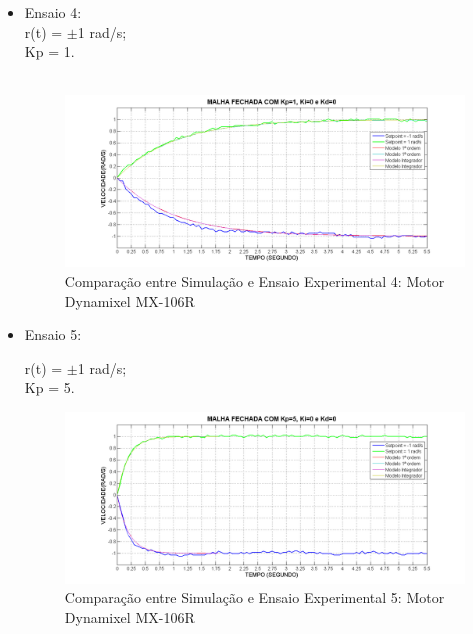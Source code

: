 \documentclass[12pt,oneside,a4paper, chapter=TITLE, section = TITLE, english, brazil]{abntex2}
\begin{document}
\begin{itemize}
\item Ensaio 4:
\\
r(t) = $\pm$1 rad/s;\\
Kp = 1.\\
\\

\begin{figure}[h] %
\centering
\includegraphics[scale=0.48]{./imagens/Mod_Ensaio4}
\caption[Comparação entre Simulação e Ensaio Experimental 4: Motor Dynamixel MX-106R]{Comparação entre Simulação e Ensaio Experimental 4: Motor Dynamixel MX-106R}
\label{fig:mod_ensaio4}
\end{figure}

\item Ensaio 5:

r(t) = $\pm$1 rad/s;\\
Kp = 5.\\

\begin{figure}[h] %
\centering
\includegraphics[scale=0.48]{./imagens/Mod_Ensaio5}
\caption[Comparação entre Simulação e Ensaio Experimental 5: Motor Dynamixel MX-106R]{Comparação entre Simulação e Ensaio Experimental 5: Motor Dynamixel MX-106R}
\label{fig:mod_ensaio5}
\end{figure}

\end{itemize}
\end{document}
